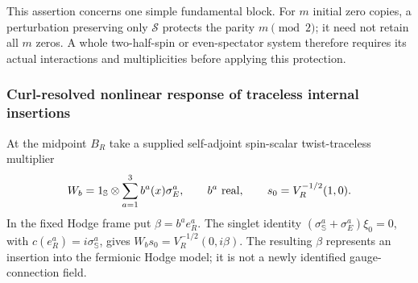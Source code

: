 \documentclass[11pt,a4paper]{article}
\begin{document}
This assertion concerns one simple fundamental block. For \(m\) initial
zero copies, a perturbation preserving only \(\mathcal S\) protects
the parity \(m\pmod2\); it need not retain all \(m\) zeros. A whole
two-half-spin or even-spectator system therefore requires its actual
interactions and multiplicities before applying this protection.



\subsubsection{Curl-resolved nonlinear response of traceless internal insertions}
\label{p3f:sec:native-source-helicity-response}

At the midpoint \(B_R\) take a supplied self-adjoint spin-scalar
twist-traceless multiplier
\[
 W_b=1_{\mathbb S}\otimes\sum_{a=1}^3 b^a(x)\sigma_E^a,
 \qquad b^a\ \hbox{real},\qquad s_0=V_R^{-1/2}(1,0).
\]
In the fixed Hodge frame put \(\beta=b^ae_R^a\). The singlet identity
\((\sigma_{\mathbb S}^a+\sigma_E^a)\xi_0=0\), with
\(c(e_R^a)=i\sigma_{\mathbb S}^a\), gives
\(W_bs_0=V_R^{-1/2}(0,i\beta)\).
The resulting \(\beta\) represents an insertion into the fermionic
Hodge model; it is not a newly identified gauge-connection field.
\end{document}
